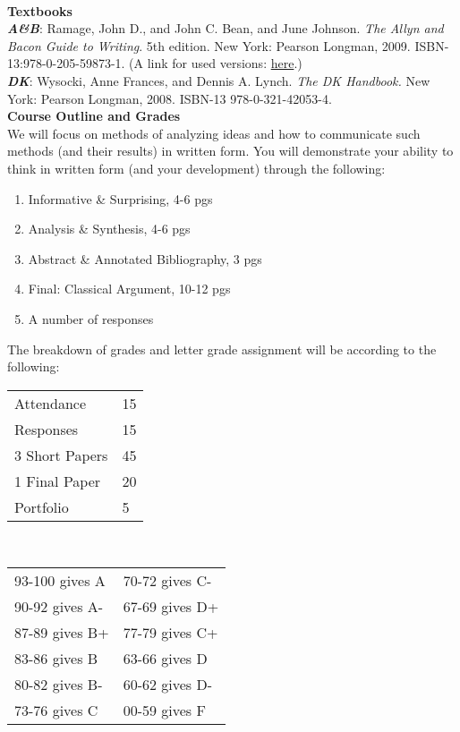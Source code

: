 \documentclass [11pt]{article}
\begin{document}
   \ \\

   {\bf Textbooks}\\
{\bf \textsl {A\&B}}: Ramage, John D., and John C. Bean, and June Johnson. {\sl The Allyn and Bacon Guide to Writing}. 5th edition. New York: Pearson Longman, 2009. ISBN-13:978-0-205-59873-1. (A link for used versions:  \href{http://www.amazon.com/Allyn-Bacon-Guide-Writing-MyCompLab/dp/0205598730/ref=sr_1_3/175-1452668-8158623?ie=UTF8&s=books&qid=1245772101&sr=1-3}{here}.) \\
{\bf \textsl {DK}}: Wysocki, Anne Frances, and Dennis A. Lynch. {\sl The DK Handbook.} New York: Pearson Longman, 2008. ISBN-13 978-0-321-42053-4. 
   \ \\

   
   {\bf Course Outline and Grades}\\
   We will focus on methods of analyzing ideas and how to communicate such methods (and their results) in written form. You will demonstrate your ability to think in written form (and your development) through the following:
   \begin{enumerate}
     \item Informative \& Surprising, 4-6 pgs
     \item Analysis \& Synthesis, 4-6 pgs
     \item Abstract \& Annotated Bibliography, 3 pgs
     \item Final: Classical Argument, 10-12 pgs
     \item A number of responses
   \end{enumerate}

The breakdown of grades and letter grade assignment will be according to the following:
\vskip 2mm
  
\begin{tabular}{|l|l|}
\hline
Attendance & 15\\
Responses & 15\\
3 Short Papers & 45\\
1 Final Paper & 20\\
Portfolio & 5\\
\hline
\end{tabular} \  \  \  \  \ \begin{tabular}{|l|l|}
   \hline
   93-100 gives A & 70-72 gives C-\\
   90-92 gives A- & 67-69 gives D+\\
   87-89 gives B+ & 77-79 gives C+\\
   83-86 gives B & 63-66 gives D\\
   80-82 gives B- & 60-62 gives D-\\
   73-76 gives C & 00-59 gives F\\
   \hline 
   \end{tabular}
   \ \\
\end{document}
